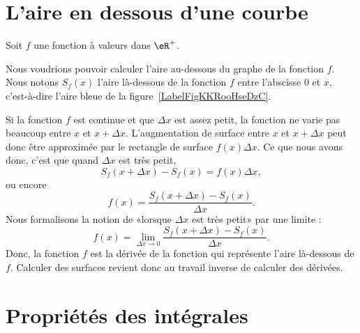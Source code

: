 
\section{L'aire en dessous d'une courbe}

Soit $f$ une fonction à valeurs dans $\eR^+$.

Nous voudrions pouvoir calculer l'aire au-dessous du graphe de la fonction \( f\). Nous notons $S_f(x)$ l'aire là-dessous de la fonction $f$ entre l'abscisse $0$ et $x$, c'est-à-dire l'aire bleue de la figure~\ref{LabelFigKKRooHseDzC}.

\newcommand{\CaptionFigKKRooHseDzC}{L'aire en dessous d'une courbe. Le rectangle rouge d'aire $f(x)\Delta x$ approxime de combien la surface augmente lorsqu'on passe de $x$ à $x+\Delta x$.}


Si la fonction $f$ est continue et que $\Delta x$ est assez petit, la fonction ne varie pas beaucoup entre $x$ et $x+\Delta x$. L'augmentation de surface entre $x$ et $x+\Delta x$ peut donc être approximée par le rectangle de surface $f(x)\Delta x$. Ce que nous avons donc, c'est que quand $\Delta x$ est très petit,
\begin{equation}
	S_f(x+\Delta x)-S_f(x)=f(x)\Delta x,
\end{equation}
ou encore
\begin{equation}
	f(x)=\frac{  S_f(x+\Delta x)-S_f(x)}{ \Delta x }.
\end{equation}
Nous formalisons la notion de «lorsque \( \Delta x\) est très petit» par une limite :
\begin{equation}
	f(x)=\lim_{\Delta x\to 0}\frac{  S_f(x+\Delta x)-S_f(x)}{ \Delta x }.
\end{equation}
Donc, la fonction $f$ est la dérivée de la fonction qui représente l'aire là-dessous de $f$. Calculer des surfaces revient donc au travail inverse de calculer des dérivées.

\section{Propriétés des intégrales}

